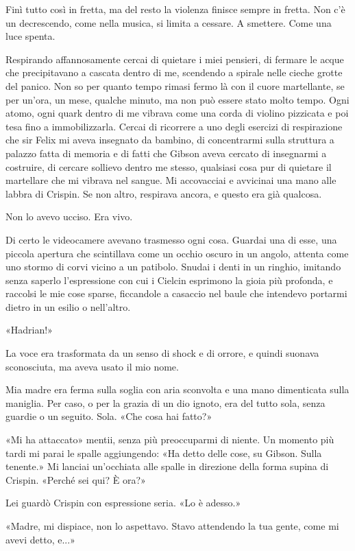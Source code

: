 Finì tutto così in fretta, ma del resto la violenza finisce sempre in
fretta. Non c'è un decrescendo, come nella musica, si limita a cessare.
A smettere. Come una luce spenta.

Respirando affannosamente cercai di quietare i miei pensieri, di fermare
le acque che precipitavano a cascata dentro di me, scendendo a spirale
nelle cieche grotte del panico. Non so per quanto tempo rimasi fermo là
con il cuore martellante, se per un'ora, un mese, qualche minuto, ma non
può essere stato molto tempo. Ogni atomo, ogni quark dentro di me
vibrava come una corda di violino pizzicata e poi tesa fino a
immobilizzarla. Cercai di ricorrere a uno degli esercizi di respirazione
che sir Felix mi aveva insegnato da bambino, di concentrarmi sulla
struttura a palazzo fatta di memoria e di fatti che Gibson aveva cercato
di insegnarmi a costruire, di cercare sollievo dentro me stesso,
qualsiasi cosa pur di quietare il martellare che mi vibrava nel sangue.
Mi accovacciai e avvicinai una mano alle labbra di Crispin. Se non
altro, respirava ancora, e questo era già qualcosa.

Non lo avevo ucciso. Era vivo.

Di certo le videocamere avevano trasmesso ogni cosa. Guardai una di
esse, una piccola apertura che scintillava come un occhio oscuro in un
angolo, attenta come uno stormo di corvi vicino a un patibolo. Snudai i
denti in un ringhio, imitando senza saperlo l'espressione con cui i
Cielcin esprimono la gioia più profonda, e raccolsi le mie cose sparse,
ficcandole a casaccio nel baule che intendevo portarmi dietro in un
esilio o nell'altro.

«Hadrian!»

La voce era trasformata da un senso di shock e di orrore, e quindi
suonava sconosciuta, ma aveva usato il mio nome.

Mia madre era ferma sulla soglia con aria sconvolta e una mano
dimenticata sulla maniglia. Per caso, o per la grazia di un dio ignoto,
era del tutto sola, senza guardie o un seguito. Sola. «Che cosa hai
fatto?»

«Mi ha attaccato» mentii, senza più preoccuparmi di niente. Un momento
più tardi mi parai le spalle aggiungendo: «Ha detto delle cose, su
Gibson. Sulla tenente.» Mi lanciai un'occhiata alle spalle in direzione
della forma supina di Crispin. «Perché sei qui? È ora?»

Lei guardò Crispin con espressione seria. «Lo è adesso.»

«Madre, mi dispiace, non lo aspettavo. Stavo attendendo la tua gente,
come mi avevi detto, e...»

